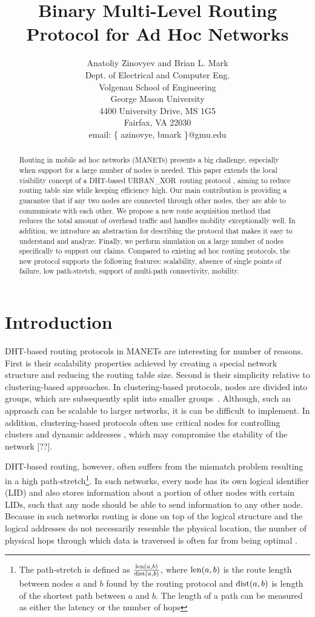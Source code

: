 \documentclass[conference]{IEEEtran}
\title{Binary Multi-Level Routing Protocol for Ad Hoc Networks}
\author{
  Anatoliy Zinovyev and Brian L. Mark \\
  Dept. of  Electrical and Computer Eng. \\
  Volgenau School of Engineering \\
  George Mason University \\
  4400 University Drive, MS 1G5 \\
  Fairfax, VA 22030 \\
  email:   \{  azinovye, bmark \}@gmu.edu \\
}
\theoremstyle{definition}
\newcommand{\urbanxor}{URBAN\_XOR}
\begin{document}
\maketitle

\begin{abstract}
Routing in mobile ad hoc networks (MANETs) presents a big challenge, especially when support for a large number of nodes is needed. This paper extends the local visibility concept of a DHT-based \urbanxor\ routing protocol \cite{urbanxor}, aiming to reduce routing table size while keeping efficiency high. Our main contribution is providing a guarantee that if any two nodes are connected through other nodes, they are able to communicate with each other. We propose a new route acquisition method that reduces the total amount of overhead 
traffic and handles mobility exceptionally well. In addition, we introduce
an abstraction for describing the protocol that makes it easy to understand and analyze. Finally, we perform simulation on a large number of nodes specifically to support our claims. Compared to existing ad hoc routing protocols, 
the new protocol supports the following features: 
scalability, absence of single points of failure, low path-stretch, support of multi-path connectivity, mobility.
\end{abstract}

\section{Introduction}
\label{sec:introduction}

DHT-based routing protocols in MANETs are interesting for number of reasons. First is their scalability properties achieved by creating a special network structure and reducing the routing table size. Second is their simplicity relative to clustering-based approaches. In clustering-based protocols, nodes are divided into groups, which are subsequently
split into smaller groups~\cite{Hong}. Although, such an approach can be scalable to larger networks, it is can be difficult to implement. In addition, clustering-based protocols often use critical nodes for controlling clusters \cite{Hong} and dynamic addresses \cite{Hong, dart, ntk}, which may compromise the stability of the network [??].

DHT-based routing, however, often suffers from the mismatch problem resulting in a high path-stretch\footnote{The path-stretch is defined as $ \frac{{\rm len}(a,b)}{{\rm dist}(a,b)} $, where ${\rm len}(a,b)$ is the route length between nodes $a$ and $b$ found by the routing protocol and ${\rm dist}(a,b)$ is length of the shortest path between $a$ and $b$. The length of a path can be measured as either the latency or the number of hops}. In such networks, every node has its own logical identifier (LID) and also stores information about a portion of other nodes with certain LIDs, such that any node should be able to send information to any other node. Because in such networks routing is done on top of the logical structure and the logical addresses do not necessarily resemble the physical location, the number of physical hops through which data is traversed is often far from being optimal \cite{Abid}.
\end{document}
